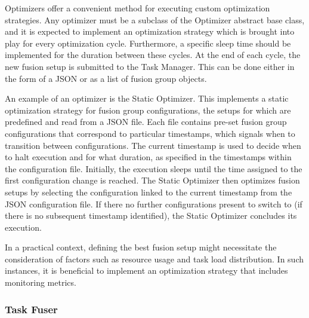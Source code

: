 Optimizers offer a convenient method for executing custom optimization
strategies. Any optimizer must be a subclass of the Optimizer abstract base
class, and it is expected to implement an optimization strategy which is brought
into play for every optimization cycle. Furthermore, a specific sleep time
should be implemented for the duration between these cycles. At the end of each
cycle, the new fusion setup is submitted to the Task Manager. This can be done
either in the form of a JSON or as a list of fusion group objects.

An example of an optimizer is the Static Optimizer. This implements a static
optimization strategy for fusion group configurations, the setups for which are
predefined and read from a JSON file. Each file contains pre-set fusion group
configurations that correspond to particular timestamps, which signals when to
transition between configurations. The current timestamp is used to decide when
to halt execution and for what duration, as specified in the timestamps within
the configuration file. Initially, the execution sleeps until the time assigned
to the first configuration change is reached. The Static Optimizer then
optimizes fusion setups by selecting the configuration linked to the current
timestamp from the JSON configuration file. If there no further configurations
present to switch to (if there is no subsequent timestamp identified), the
Static Optimizer concludes its execution.

In a practical context, defining the best fusion setup might necessitate the
consideration of factors such as resource usage and task load distribution. In
such instances, it is beneficial to implement an optimization strategy that
includes monitoring metrics.

\subsubsection{Task Fuser}

%
%
%

